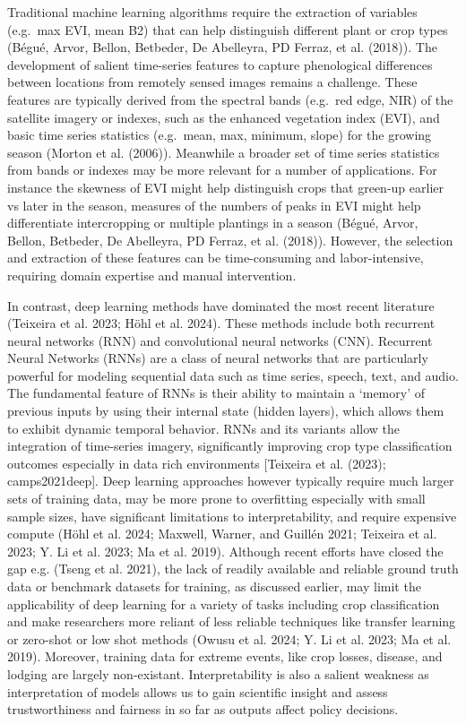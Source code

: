 \documentclass[
]{article}
\begin{document}
Traditional machine learning algorithms require the extraction of
variables (e.g.~max EVI, mean B2) that can help distinguish different
plant or crop types (Bégué, Arvor, Bellon, Betbeder, De Abelleyra, PD
Ferraz, et al. (2018)). The development of salient time-series features
to capture phenological differences between locations from remotely
sensed images remains a challenge. These features are typically derived
from the spectral bands (e.g.~red edge, NIR) of the satellite imagery or
indexes, such as the enhanced vegetation index (EVI), and basic time
series statistics (e.g.~mean, max, minimum, slope) for the growing
season (Morton et al. (2006)). Meanwhile a broader set of time series
statistics from bands or indexes may be more relevant for a number of
applications. For instance the skewness of EVI might help distinguish
crops that green-up earlier vs later in the season, measures of the
numbers of peaks in EVI might help differentiate intercropping or
multiple plantings in a season (Bégué, Arvor, Bellon, Betbeder, De
Abelleyra, PD Ferraz, et al. (2018)). However, the selection and
extraction of these features can be time-consuming and labor-intensive,
requiring domain expertise and manual intervention.

In contrast, deep learning methods have dominated the most recent
literature (Teixeira et al. 2023; Höhl et al. 2024). These methods
include both recurrent neural networks (RNN) and convolutional neural
networks (CNN). Recurrent Neural Networks (RNNs) are a class of neural
networks that are particularly powerful for modeling sequential data
such as time series, speech, text, and audio. The fundamental feature of
RNNs is their ability to maintain a `memory' of previous inputs by using
their internal state (hidden layers), which allows them to exhibit
dynamic temporal behavior. RNNs and its variants allow the integration
of time-series imagery, significantly improving crop type classification
outcomes especially in data rich environments {[}Teixeira et al. (2023);
camps2021deep{]}. Deep learning approaches however typically require
much larger sets of training data, may be more prone to overfitting
especially with small sample sizes, have significant limitations to
interpretability, and require expensive compute (Höhl et al. 2024;
Maxwell, Warner, and Guillén 2021; Teixeira et al. 2023; Y. Li et al.
2023; Ma et al. 2019). Although recent efforts have closed the gap e.g.
(Tseng et al. 2021), the lack of readily available and reliable ground
truth data or benchmark datasets for training, as discussed earlier, may
limit the applicability of deep learning for a variety of tasks
including crop classification and make researchers more reliant of less
reliable techniques like transfer learning or zero-shot or low shot
methods (Owusu et al. 2024; Y. Li et al. 2023; Ma et al. 2019).
Moreover, training data for extreme events, like crop losses, disease,
and lodging are largely non-existant. Interpretability is also a salient
weakness as interpretation of models allows us to gain scientific
insight and assess trustworthiness and fairness in so far as outputs
affect policy decisions.
\end{document}
